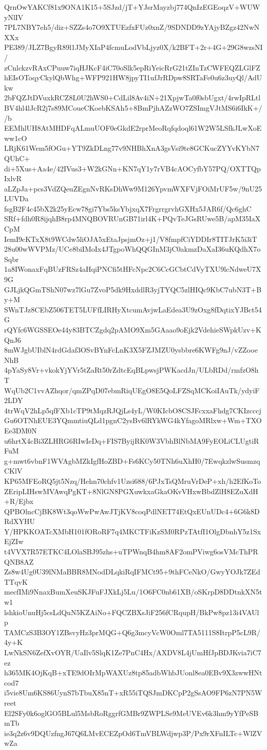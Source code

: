 QrnOwYAKCf81x9ONA1K15+5SJzd/jT+YJsrMayzbj774QnIzEGEoqzV+WUWyNlIV
7PL7NBY7eh5/diz+SZZs4o7O9XTUEzfxFUz0xnZ/9SDNDD9zYAjyBZgz42NwNXXx
PE389/JLZ7BgyR89l1JMyXIaP4fcmuLodVbLjyz0X/k2BFT+2r+4G+29G8wzsNI/
zCnlckzvRAxCPuuw7iqHJKcF4iC70oSlk5epRiYeicRrG21tZInTzCWFEQZLGlFZ
hEIsOToqyCkylQbWhg+WFP921HW8jpyTI1ufJrRDpw8SRTaFe0u6z3uyQl/AdUkw
2bFQZJtDVuxkRCZ8L0U2hWS0+CdLil8Av4iN+21XpjwTa0f0sbUgxt/4rwIpRLtl
BV4hl4lJcR2j7s89MCoueCKoebKSAh5+8BmPjhAZzWO7ZSImgVJtMS6i6IkK+//b
EEMhlUH8AtMHDFqALmuUOF0eGkdE2rprMeoRqfqdoql61W2W5LSfkJLwXoEww1cO
LRjK61Wem5fOGu+YT9ZkDLng77v9NHBhXnA3gsVsi9te8GCKucZYYvKYbN7QUhC+
di+5Xus+Aa4e/42IVus3+W2kGNn+KN7qY1y7rVB4cAOCyfbY57PQ/OXTTQpIxlvR
aLZpJa+pcs3VdZQeuZEgnNvRKsDhWw9M126YpvmWXFVjFOiMrUF5w/9nU25LUVDa
fsgB2F4c45bX2k25yEcw78gi7Ybs5ksYbjxqX7FrgrrgrvhGXHx5JAR6f/Qc6ghC
SRf+fdh0R8ijqhB8rp4MNQBOVRUnGB71irl4K+PQvTeJGsRUwe5B/apM35IaXCpM
IemI9cKTxX8t9WCdw5liOJA5xEtaJpsjmOz+j1/V8fmpfCiYDDIr8TITJrK5i3iT
28u00wWVPMz/UCe8biIMoIx4JTgpoWhQQGInM3jC0akmzDaXaI36uKQdhX7oSqbr
1a8IWonaxFqBUzFRSz4aHqiPNCfi5tHFcNpc2C6CcGCbtCdVyTXU9lcNdweU7X9G
GJLjkQGmTShN07wz7lGu7ZvoP5dk9HxddlR3yjTYQC5zlHIQc9KbC7ubN3T+By+M
SWnTJz8CEbZ506TET5LUFfLIRHyXtcumAvjwLaEdea3U9zOxg8fDqtixYJBct54G
rQYfc6WGSSEOe44y83BTCZgdq2pAMO9Xm5GAaao9oEjk2VdehieSWpkUzv+KQnJ6
8mWJgbUIblN4rdGdaf3OSvBYnFcLnK3X5FZJMZU0ysbbre6KWFg9nJ/vZZooeNhB
4pYaSy8Vr+vkokYjYVr5tZaRt50rZdtcEqBLpwsjPWKacdJn/ULbRDd/rmfzO8hT
WqUb2C1vvAZhqor/qmZPqD07ebmRiqUEgO8E5QoLFZSqMCKoiIAuTk/ydyiF2LDY
4trWqV2hLp5qfFXb1cTP9tMqzRJQjLs4yL/W0KIcbO8CSJFcxxaFhdg7CKIzcccj
Gu6OTNhEUE3YQmmtiuQLd1pgnC2ysBv6lRYkWG4kYfagoMRlxw+Wm+TXOEe3DM0N
u6hrtX4cBi3ZLHRG6RIwIeDq+FIS7ByijRK0W3VbhBlNbMA9FyEOLiCLUgtiRFuM
g+mwt6vbnF1WVAgbMZkIgfHoZBD+Fs6KCy50TNh6uXhH0/7EwqkzlwSusmzqCKlV
KP65MFEoRQ5jt5Nzq/Hehn70chfv1Uzsi688/6PJxTsQMruVrDeP+xh/h2EfKoTo
ZEripLIHswMVAwqPgKT+8NlGN8PGXuwkxaGkaOKvVHxwBbdZlH8EZuXdH+R/Ejbx
QPBOlncCjBK8Wt3qoWwPwAwJTjKV8coqPdlNET74EtQxEUnUDc4+6G6k8DRdXYHU
Y/HPKKOATcXMbH101fORoRF7q4MKCTFiKzSM0RPzTAtfI1OlgDbnhY5z1SxEjZIw
t4VVX7R57ETKC4LOlaSBJ95zhs+uTPWnqB4hm8AF2omPViwg6osVMcThPRQNB8AZ
Zs8w4Ug0U39lNMaBBR8MNodDLqkiRqIFMCt95+9thFCeNkO/GwyYOJk7ZEdTTqvK
mecfIMi9NnaxBumXeuSKJFuFJXkLj5Lu/1O6FC0nb61XB/oSKrpD8DDtnkXN5tw1
lshkioUnuHj5csLdQuN5KZAiNo+FQCZBXsJiF256fCRqupH/BkPw8pz13i4VAUlp
TAMCzS3B3OY1ZBsvyHz3prMQG+Q6g3mcyVcW0Oml7TA5111S8ItrpP5cL9R/4y+K
LwNkSN6ZefXvOYR/UaIlv5SlqK1Ze7PnC4Hx/AXDV8L4jUmHfJpBDJKvia7iC7ez
h365MK4OjKqB+xTE9dOIrMpWAXUz8tp85adbWhbJUonl8ea0EBv9X3zwwHNtcod7
i5vie8Um6KS86UynS7bTbuX85nT+xR55iTQSJmDKCpP2gSsAO9FP6zN7PN5Wreet
El2SFy0k6oglGO5BLul5MsbRoRggrfGMBr9ZWPLSe9MeUVEv6k3hm9yYfPeSBmTb
ie3q2z6v9DQUzfngJ67Q6LMvECEZpOd6TmVBLWdjwp3P/Px9rXFnILTc+WlZVwZa
